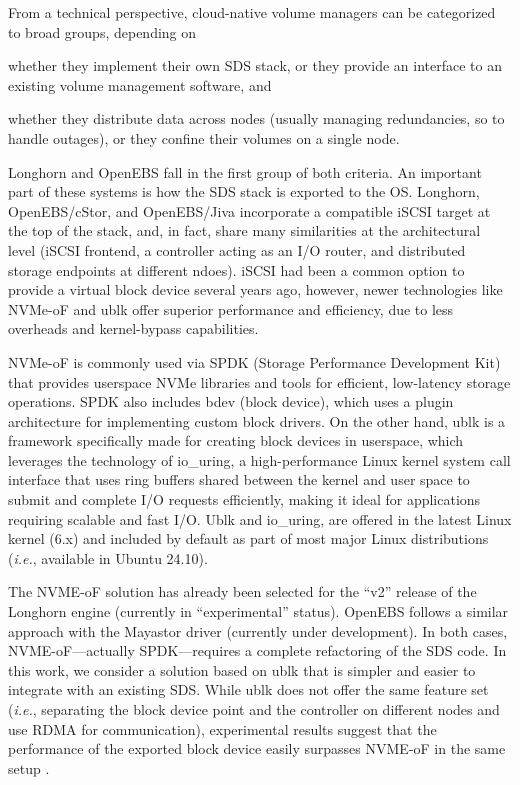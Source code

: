 From a technical perspective, cloud-native volume managers can be categorized to broad groups, depending on
\begin{enumerate*}[label=(\roman*)]
    \item whether they implement their own SDS stack, or they provide an interface to an existing volume management software, and 
    \item whether they distribute data across nodes (usually managing redundancies, so to handle outages), or they confine their volumes on a single node.
\end{enumerate*}
Longhorn and OpenEBS fall in the first group of both criteria. 
An important part of these systems is how the SDS stack is exported to the OS. Longhorn, OpenEBS/cStor, and OpenEBS/Jiva incorporate a compatible iSCSI target at the top of the stack, and, in fact, share many similarities at the architectural level (iSCSI frontend, a controller acting as an I/O router, and distributed storage endpoints at different ndoes). iSCSI had been a common option to provide a virtual block device several years ago, however, newer technologies like NVMe-oF and ublk offer superior performance and efficiency, due to less overheads and kernel-bypass capabilities.

NVMe-oF is commonly used via SPDK (Storage Performance Development Kit) \cite{spdk} that provides userspace NVMe libraries and tools for efficient, low-latency storage operations. SPDK also includes bdev (block device), which uses a plugin architecture for implementing custom block drivers. On the other hand, ublk is a framework specifically made for creating block devices in userspace, which leverages the technology of io\_uring, a high-performance Linux kernel system call interface that uses ring buffers shared between the kernel and user space to submit and complete I/O requests efficiently, making it ideal for applications requiring scalable and fast I/O. Ublk and io\_uring, are offered in the latest Linux kernel (6.x) and included by default as part of most major Linux distributions (\textit{i.e.}, available in Ubuntu 24.10).

The NVME-oF solution has already been selected for the ``v2'' release of the Longhorn engine (currently in ``experimental'' status). OpenEBS follows a similar approach with the Mayastor driver \cite{mayastor} (currently under development). In both cases, NVME-oF---actually SPDK---requires a complete refactoring of the SDS code. In this work, we consider a solution based on ublk that is simpler and easier to integrate with an existing SDS. While ublk does not offer the same feature set (\textit{i.e.}, separating the block device point and the controller on different nodes and use RDMA for communication), experimental results suggest that the performance of the exported block device easily surpasses NVME-oF in the same setup \cite{longhorn_performance}.
